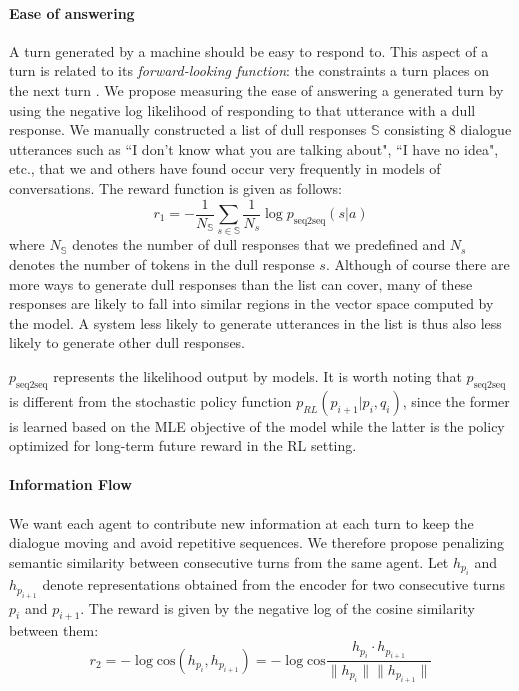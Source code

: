 \paragraph{Ease of answering}
A turn generated by a machine should be easy to respond to.
This aspect of a turn is related to its {\em forward-looking function}: the constraints
a turn places on the next turn \cite{All92}.
We propose measuring the ease of answering a generated turn by
using the negative log likelihood of responding to that utterance with a dull response.
We manually constructed a list of dull responses $\mathbb{S}$ consisting 8 dialogue utterances such as ``I don't know what you are talking about", ``I have no idea", etc., that we and others have found
occur very frequently in \sts models of conversations.
The reward function is given as follows:
\begin{equation}
r_1=-\frac{1}{N_{\mathbb{S}}}\sum_{s\in \mathbb{S}}\frac{1}{N_s}\log p_{\text{seq2seq}} (s|a)
\label{eq1}
\end{equation}
where $N_{\mathbb{S}}$ denotes the
number of dull responses that we predefined 
 and $N_s$ denotes the number of tokens in the dull response $s$. 
Although of course there are more ways to generate dull responses than the list can cover,
many of these responses are likely to fall into similar regions in the vector space computed by the model.
A system less likely to generate utterances in the list is thus also less likely to generate other dull responses. 

$p_{\text{seq2seq}}$ represents the  likelihood output by \sts models. 
It is worth noting that $p_{\text{seq2seq}}$ is different from the stochastic policy function $p_{RL}(p_{i+1}|p_{i}, q_i)$, since the former is learned based on the MLE objective of the \sts model while the latter is the policy optimized for long-term future reward in the RL setting.

\paragraph{Information Flow}
We want each agent to contribute new information at each turn to keep the dialogue moving and avoid repetitive sequences. 
We therefore propose penalizing semantic similarity between consecutive turns from the same agent. 
Let $h_{p_i}$ and $h_{p_{i+1}}$ denote representations obtained from the encoder for two consecutive turns $p_i$ and $p_{i+1}$. The reward is given by the negative log of the cosine similarity
between them:
\begin{equation}
r_2=-\log \text{cos}(h_{p_i},h_{p_{i+1}}) = -\log \text{cos} \frac{h_{p_i} \cdot h_{p_{i+1}}}{\lVert h_{p_i} \rVert \lVert h_{p_{i+1}} \rVert}
\label{sim}
\end{equation}
